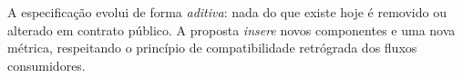 \begin{pontochave}
A especificação evolui de forma \emph{aditiva}: nada do que existe hoje é
removido ou alterado em contrato público. A proposta \emph{insere} novos
componentes e uma nova métrica, respeitando o princípio de compatibilidade
retrógrada dos fluxos consumidores.
\end{pontochave}
